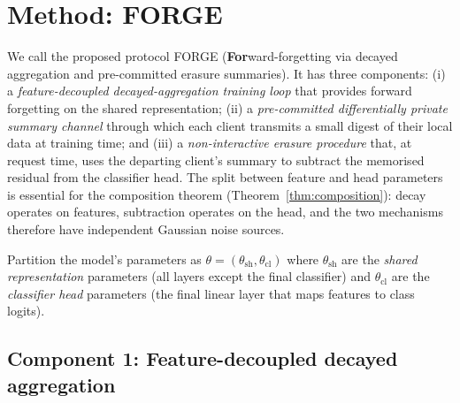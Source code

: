 \section{Method: FORGE}
\label{sec:method}

We call the proposed protocol FORGE (\textbf{For}ward-forgetting via
decayed aggregation and pre-committed erasure summaries). It has three
components: (i) a \emph{feature-decoupled decayed-aggregation training loop}
that provides forward forgetting on the shared representation; (ii) a
\emph{pre-committed differentially private summary channel} through which
each client transmits a small digest of their local data at training time;
and (iii) a \emph{non-interactive erasure procedure} that, at request time,
uses the departing client's summary to subtract the memorised residual from
the classifier head. The split between feature and head parameters is
essential for the composition theorem (Theorem~\ref{thm:composition}): decay
operates on features, subtraction operates on the head, and the two
mechanisms therefore have independent Gaussian noise sources.

Partition the model's parameters as $\theta = (\theta_\mathrm{sh},
\theta_\mathrm{cl})$ where $\theta_\mathrm{sh}$ are the \emph{shared
representation} parameters (all layers except the final classifier) and
$\theta_\mathrm{cl}$ are the \emph{classifier head} parameters (the final
linear layer that maps features to class logits).

\subsection{Component 1: Feature-decoupled decayed aggregation}
\label{sec:method-decay}

